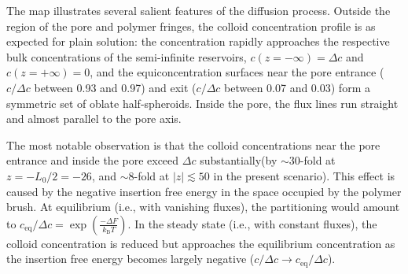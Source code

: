 \documentclass[12pt, a4paper]{article}
\begin{document}
The map illustrates several salient features of the diffusion process.
Outside the region of the pore and polymer fringes, the colloid concentration profile is as expected for plain solution: the concentration rapidly approaches the respective bulk concentrations of the semi-infinite reservoirs, $c(z = -\infty) = \Delta c$ and $c(z = +\infty) = 0$, and the equiconcentration surfaces near the pore entrance ($c/\Delta c$ between 0.93 and 0.97) and exit ($c/\Delta c$ between 0.07 and 0.03) form a symmetric set of oblate half-spheroids.
Inside the pore, the flux lines run straight and almost parallel to the pore axis.




The most notable observation is that the colloid concentrations near the pore entrance and inside the pore exceed $\Delta c$ substantially(by $\sim30$-fold at $z = -L_{0}/2 = -26$, and $\sim8$-fold at $|z| \lesssim 50$ in the present scenario).
This effect is caused by the negative insertion free energy in the space occupied by the polymer brush.
At equilibrium (i.e., with vanishing fluxes), the partitioning would amount to $c_{\text{eq}}/\Delta c = \exp\left( \frac{-\Delta F}{k_{\text{B}} T} \right)$.
In the steady state (i.e., with constant fluxes), the colloid concentration is reduced but approaches the equilibrium concentration as the insertion free energy becomes largely negative ($c/\Delta c \to c_{\text{eq}}/\Delta c$).
\end{document}
